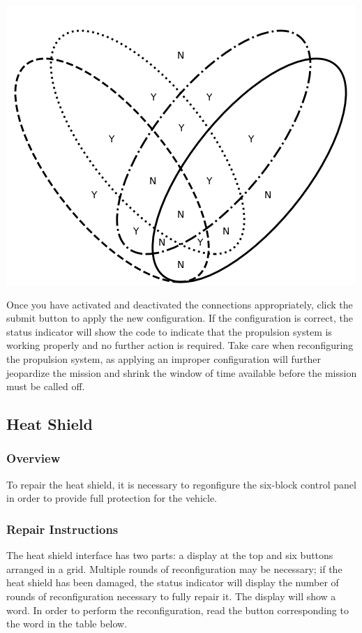 \documentclass[12pt]{article}
\def\overview{\subsubsection*{Overview}}
\def\instruc{\subsubsection*{Repair Instructions}}
\newcommand{\status}[1]{\fbox{\texttt{#1}}}
\begin{document}
\begin{center}
\includegraphics{venn-diagram}
\end{center}

Once you have activated and deactivated the connections appropriately, click the submit button to apply the new configuration. If the configuration is correct, the status indicator will show the code \status{BB} to indicate that the propulsion system is working properly and no further action is required. Take care when reconfiguring the propulsion system, as applying an improper configuration will further jeopardize the mission and shrink the window of time available before the mission must be called off.

\subsection*{Heat Shield}

\overview

To repair the heat shield, it is necessary to regonfigure the six-block control panel in order to provide full protection for the vehicle.

\instruc

The heat shield interface has two parts: a display at the top and six buttons arranged in a grid. Multiple rounds of reconfiguration may be necessary; if the heat shield has been damaged, the status indicator will display the number of rounds of reconfiguration necessary to fully repair it. The display will show a word. In order to perform the reconfiguration, read the button corresponding to the word in the table below.
\end{document}
